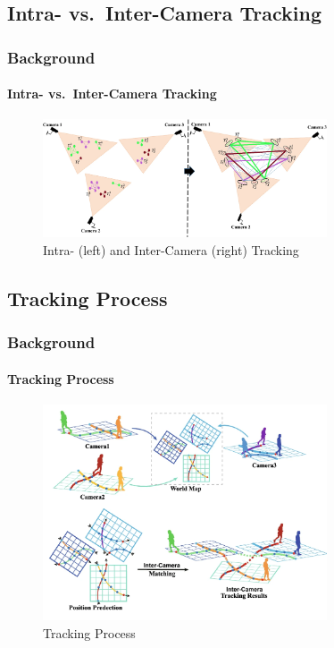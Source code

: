\subsection{Intra- vs.~Inter-Camera Tracking}
\begin{frame}
    \frametitle{Background}
    \framesubtitle{Intra- vs.~Inter-Camera Tracking}

    \begin{figure}[ht]
        \centering
        \includegraphics[width=0.75\textwidth]{resources/fig/Tesfaye19-intra_inter_camera_tracking.png}
        \caption[Intra- and Inter-Camera Tracking]{Intra- (left) and Inter-Camera (right) Tracking~\cite[Fig.~1]{Tesfaye19}}\label{fig:intra_inter_camera_tracking}
    \end{figure}
\end{frame}

\subsection{Tracking Process}
\begin{frame}
    \frametitle{Background}
    \framesubtitle{Tracking Process}

    \begin{figure}[ht]
        \centering
        \includegraphics[width=0.75\textwidth]{resources/fig/Ma21-tracking_process.png}
        \caption[Tracking Process]{Tracking Process~\cite[Fig.~1]{Ma21}}\label{fig:projection}
    \end{figure}
\end{frame}

